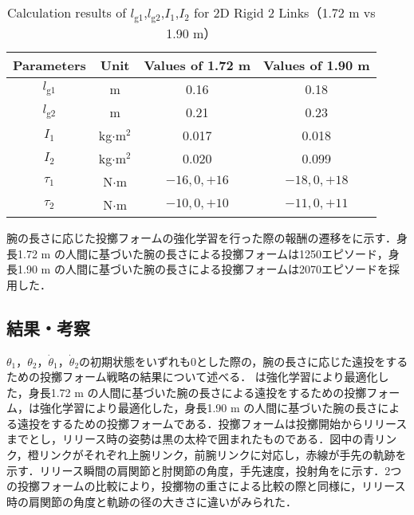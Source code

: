 \begin{table}[tb]
  \begin{center}
    \caption{Calculation results of $l_{\mathrm{g1}}$,$l_{\mathrm{g2}}$,$I_{1}$,$I_{2}$ for 2D Rigid 2 Links（1.72 m vs 1.90 m）}
    \begin{tabular}{c|c|c|c}
      \hline
      Parameters & Unit & Values of 1.72 m & Values of 1.90 m \\
      \hline
      $l_{\mathrm{g1}}$ & m & 0.16 & 0.18 \\
      $l_{\mathrm{g2}}$ & m & 0.21 & 0.23 \\
      $I_{1}$ & kg$\cdot$$\mathrm{m}^2$ & 0.017 & 0.018 \\
      $I_{2}$ & kg$\cdot$$\mathrm{m}^2$ & 0.020 & 0.099 \\
      $\tau_{1}$ & N$\cdot$m & $-16, 0, +16$ & $-18, 0, +18$ \\
      $\tau_{2}$ & N$\cdot$m & $-10, 0, +10$ & $-11, 0, +11$ \\
      \hline
    \end{tabular}
  \end{center}
\end{table}

腕の長さに応じた投擲フォームの強化学習を行った際の報酬の遷移をに示す．身長1.72 m の人間に基づいた腕の長さによる投擲フォームは1250エピソード，身長1.90 m の人間に基づいた腕の長さによる投擲フォームは2070エピソードを採用した．


\subsection{結果・考察}
$\theta_{1}$，$\theta_{2}$，$\dot{\theta}_{1}$，$\dot{\theta}_{2}$の初期状態をいずれも0とした際の，腕の長さに応じた遠投をするための投擲フォーム戦略の結果について述べる．
は強化学習により最適化した，身長1.72 m の人間に基づいた腕の長さによる遠投をするための投擲フォーム，は強化学習により最適化した，身長1.90 m の人間に基づいた腕の長さによる遠投をするための投擲フォームである．投擲フォームは投擲開始からリリースまでとし，リリース時の姿勢は黒の太枠で囲まれたものである．図中の青リンク，橙リンクがそれぞれ上腕リンク，前腕リンクに対応し，赤線が手先の軌跡を示す．リリース瞬間の肩関節と肘関節の角度，手先速度，投射角をに示す．2つの投擲フォームの比較により，投擲物の重さによる比較の際と同様に，リリース時の肩関節の角度と軌跡の径の大きさに違いがみられた．


